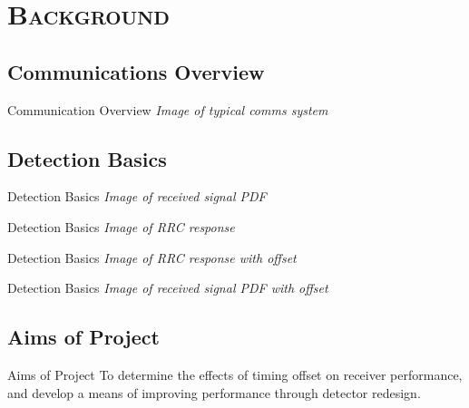 \documentclass[xcolor=x11names,compress]{beamer}
\renewcommand{\(}{\begin{columns}}
\renewcommand{\)}{\end{columns}}
\newcommand{\<}[1]{\begin{column}{#1}}
\renewcommand{\>}{\end{column}}
\begin{document}
\section{\scshape Background}
\subsection{Communications Overview}
\begin{frame}{Communication Overview}
\emph{Image of typical comms system}
\end{frame}

\subsection{Detection Basics}
\begin{frame}{Detection Basics}
\emph{Image of received signal PDF}
\end{frame}

\begin{frame}{Detection Basics}
\emph{Image of RRC response}
\end{frame}

\begin{frame}{Detection Basics}
\emph{Image of RRC response with offset}
\end{frame}

\begin{frame}{Detection Basics}
\emph{Image of received signal PDF with offset}
\end{frame}

\subsection{Aims of Project}
\begin{frame}{Aims of Project}
To determine the effects of timing offset on receiver performance, and develop a means of improving performance through detector redesign.
\end{frame}
\end{document}
